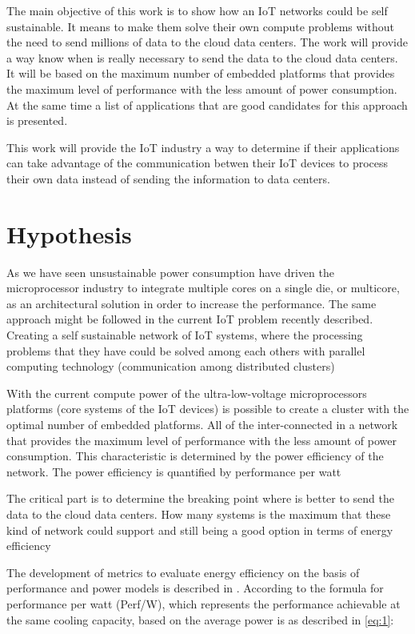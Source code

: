 The main objective of this work is to show how an IoT networks could be self
sustainable. It means to make them solve their own compute problems without the
need to send millions of data to the cloud data centers. The work will provide
a way know when is really necessary to send the data to the cloud data centers.
It will be based on the maximum number of embedded platforms that provides the
maximum level of performance with the less amount of power consumption. At the
same time a list of applications that are good candidates for this approach is
presented. 

This work will provide the IoT industry a way  to determine if their
applications can take advantage of the communication betwen their IoT devices
to process their own data instead of sending the information to data centers.

\section{Hypothesis}
\noindent

As we have seen unsustainable power consumption have driven the microprocessor
industry to integrate multiple cores on a single die, or multicore, as an
architectural solution in order to increase the performance. The same approach
might be followed in the current IoT problem recently described. Creating a
self sustainable network of IoT systems, where the processing problems that
they have could be solved among each others with parallel computing technology
(communication among distributed clusters)

With the current compute power of the ultra-low-voltage microprocessors
platforms (core systems of the IoT devices) is possible to create a cluster
with the optimal number of embedded platforms. All of the inter-connected in a
network that provides the maximum level of performance with the less amount of
power consumption. This characteristic is determined by the power efficiency of
the network. The power efficiency is quantified by performance per watt
\cite{Jun}

The critical part is to determine the breaking point where is better to send
the data to the cloud data centers. How many systems is the maximum that these
kind of network could support and still being a good option in terms of energy
efficiency

The development of metrics to evaluate energy efficiency on the basis of
performance and power models is described in \cite{Dong}. According to
\cite{Dong} the formula for performance per watt (Perf/W), which represents the
performance achievable at the same cooling capacity, based on the average power
is as described in \ref{eq:1}:

